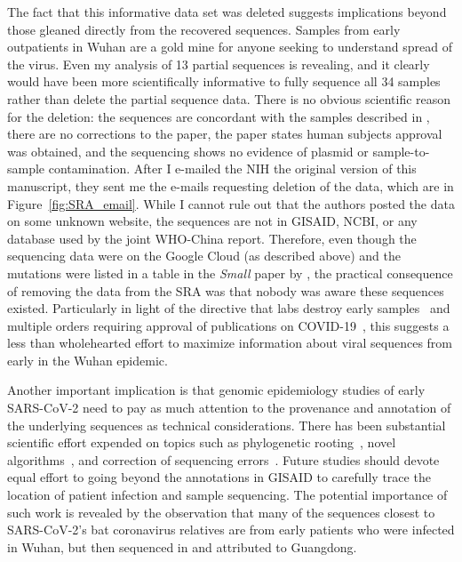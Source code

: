 \documentclass[9pt,twocolumn,twoside]{gsajnl_modified}
\begin{document}
The fact that this informative data set was deleted suggests implications beyond those gleaned directly from the recovered sequences.
Samples from early outpatients in Wuhan are a gold mine for anyone seeking to understand spread of the virus.
Even my analysis of 13 partial sequences is revealing, and it clearly would have been more scientifically informative to fully sequence all 34 samples rather than delete the partial sequence data.
There is no obvious scientific reason for the deletion: the sequences are concordant with the samples described in \citet{wang2020medRxiv,wang2020small}, there are no corrections to the paper, the paper states human subjects approval was obtained, and the sequencing shows no evidence of plasmid or sample-to-sample contamination.
After I e-mailed the NIH the original version of this manuscript, they sent me the e-mails requesting deletion of the data, which are in Figure~\ref{fig:SRA_email}.
While I cannot rule out that the authors posted the data on some unknown website, the sequences are not in GISAID, NCBI, or any database used by the joint WHO-China report.
Therefore, even though the sequencing data were on the Google Cloud (as described above) and the mutations were listed in a table in the \textit{Small} paper by \citet{wang2020small}, the practical consequence of removing the data from the SRA was that nobody was aware these sequences existed.
Particularly in light of the directive that labs destroy early samples~\citep{pinghui2020SCMP} and multiple orders requiring approval of publications on COVID-19~\citep{chinacdc2020, Kang2020}, this suggests a less than wholehearted effort to maximize information about viral sequences from early in the Wuhan epidemic.

Another important implication is that genomic epidemiology studies of early SARS-CoV-2 need to pay as much attention to the provenance and annotation of the underlying sequences as technical considerations.
There has been substantial scientific effort expended on topics such as phylogenetic rooting~\citep{pipes2021assessing, morel2021phylogenetic}, novel algorithms~\citep{kumar2021evolutionary}, and correction of sequencing errors~\citep{turakhia2020stability}.
Future studies should devote equal effort to going beyond the annotations in GISAID to carefully trace the location of patient infection and sample sequencing.
The potential importance of such work is revealed by the observation that many of the sequences closest to SARS-CoV-2's bat coronavirus relatives are from early patients who were infected in Wuhan, but then sequenced in and attributed to Guangdong.
\end{document}
